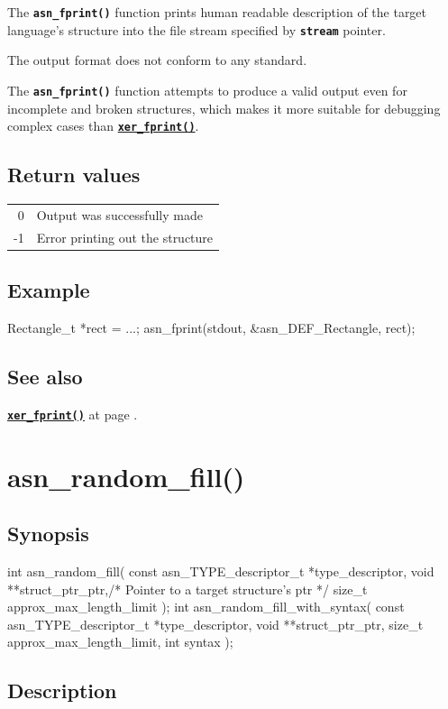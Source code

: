 \documentclass[english,oneside,12pt]{book}
\newcommand{\apisection}[2]{\clearpage\section{\label{#1}#2}}
\newcommand{\api}[2]{\hyperref[#1]{\code{#2}}}
\newcommand{\seealso}[2]{\api{#1}{#2} at page \pageref{#1}}
\newcommand{\code}[1]{\texttt{\textbf{\lstinline{#1}}}}
\begin{document}
The \code{asn_fprint()} function prints human readable description
of the target language's structure into the file stream specified by
\code{stream} pointer.

The output format does not conform to any standard.

The \code{asn_fprint()} function attempts to
produce a valid output even for incomplete and broken structures, which
makes it more suitable for debugging complex cases than
\api{sec:xer_fprint}{xer_fprint()}.

\subsection*{Return values}

\begin{tabular}[h!]{rl}
0 & Output was successfully made \\
-1 & Error printing out the structure
\end{tabular}

\subsection*{Example}
\begin{example}
Rectangle_t *rect = ...;
asn_fprint(stdout, &asn_DEF_Rectangle, rect);
\end{example}

\subsection*{See also}
\seealso{sec:xer_fprint}{xer_fprint()}.

\apisection{sec:asn_random_fill}{asn\_random\_fill()}

\subsection*{Synopsis}
\begin{signature}
int asn_random_fill(
    const asn_TYPE_descriptor_t *type_descriptor,
    void **struct_ptr_ptr,/* Pointer to a target structure's ptr */
    size_t approx_max_length_limit
);
int asn_random_fill_with_syntax(
    const asn_TYPE_descriptor_t *type_descriptor,
    void **struct_ptr_ptr,
    size_t approx_max_length_limit, int syntax
);
\end{signature}

\subsection*{Description}
\end{document}
